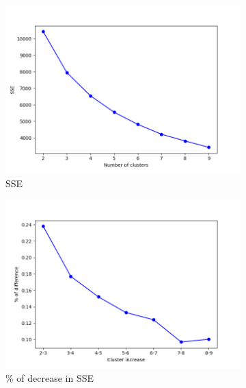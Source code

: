 \begin{figure}[h!]
     \captionsetup{justification=centering}		
     \centering
     \begin{subfigure}{0.32\textwidth}
         \centering
         \includegraphics[width=\textwidth]{img/clust_1/sse.png}
         \caption{SSE}
         \label{fig:sse_img}
     \end{subfigure}
     \begin{subfigure}{0.32\textwidth}
         \centering
         \includegraphics[width=\textwidth]{img/clust_1/perc.png}
         \caption{\% of decrease in SSE}
         \label{fig:pdiff_img}
     \end{subfigure}
     \begin{subfigure}{0.32\textwidth}
         \centering

\end{subfigure}
\end{figure}
